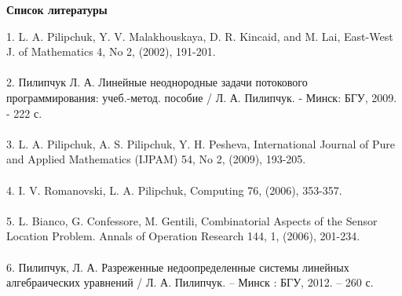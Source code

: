 \documentclass[14pt]{extarticle}%
\begin{document}
\newpage
\begin{center}
    \textbf{Список литературы}
\end{center}
1. L. A. Pilipchuk, Y. V. Malakhouskaya, D. R. Kincaid, and M. Lai, East-West J. of Mathematics 4, No 2, (2002), 191-201.\\
\\
2. Пилипчук Л. А. Линейные неоднородные задачи потокового программирования: учеб.-метод. пособие / Л. А. Пилипчук. - Минск: БГУ, 2009. - 222 с.\\
\\
3. L. A. Pilipchuk, A. S. Pilipchuk, Y. H. Pesheva, International Journal of Pure and Applied Mathematics (IJPAM) 54, No 2, (2009), 193-205.\\
\\
4. I. V. Romanovski, L. A. Pilipchuk, Computing 76, (2006), 353-357.\\
\\
5. L. Bianco, G. Confessore, M. Gentili, Combinatorial Aspects of the Sensor Location Problem. Annals of Operation Research 144, 1, (2006), 201-234.\\
\\
6. Пилипчук, Л. А. Разреженные недоопределенные системы линейных алгебраических уравнений / Л. А. Пилипчук. – Минск : БГУ, 2012. – 260 с.
\end{document}

